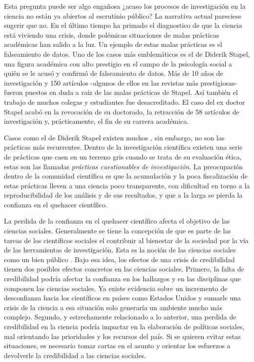 \documentclass[
]{book}
\begin{document}
Esta pregunta puede ser algo engañosa ¿acaso los procesos de investigación en la ciencia no están ya abiertos al escrutinio público? La narrativa actual pareciese sugerir que no. En el último tiempo ha primado el diagnostico de que la ciencia está viviendo una crisis, donde polémicas situaciones de malas prácticas académicas han salido a la luz. Un ejemplo de estas malas prácticas es el falseamiento de datos. Uno de los casos más emblemáticos es el de Diderik Stapel, una figura académica con alto prestigio en el campo de la psicología social a quién se le acusó y confirmó de falseamiento de datos. Más de 10 años de investigación y 150 artículos -algunos de ellos en las revistas más prestigiosas- fueron puestos en duda a raíz de las malas prácticas de Stapel. Así también el trabajo de muchos colegas y estudiantes fue desacreditado. El caso del ex doctor Stapel acabó en la revocación de su doctorado, la retracción de 58 artículos de investigación y, prácticamente, el fin de su carrera académica.

Casos como el de Diderik Stapel existen muchos \citep[ver][]{abrilruiz_Manzanas_2019}, sin embargo, no son las prácticas más recurrentes. Dentro de la investigación científica existen una serie de prácticas que caen en un terreno gris cuando se trata de su evaluación ética, estas son las llamadas \emph{prácticas cuestionables de investigación}. La preocupación dentro de la comunidad científica es que la acumulación y la poca fiscalización de estas prácticas lleven a una ciencia poco transparente, con dificultad en torno a la reproducibilidad de los análisis y de sus resultados, y que a la larga se pierda la confianza en el quehacer científico.

La perdida de la confianza en el quehacer científico afecta el objetivo de las ciencias sociales. Generalmente se tiene la concepción de que es parte de las tareas de los científicos sociales el contribuir al bienestar de la sociedad por la vía de las herramientas de investigación. Esta es la noción de las ciencias sociales como un bien público \citep{thibodeaux_Production_2016}. Bajo esa idea, los efectos de una crisis de credibilidad tienen dos posibles efectos concretos en las ciencias sociales. Primero, la falta de credibilidad podría afectar la confianza en los hallazgos y en las disciplinas que componen las ciencias sociales. Ya existe evidencia sobre un incremento de desconfianza hacia los científicos en países como Estados Unidos \citep{motta_Dynamics_2018} y sumarle una crisis de la ciencia a esa situación solo generaría un ambiente mucho más complejo. Segundo, y estrechamente relacionado a lo anterior, una perdida de credibilidad en la ciencia podría impactar en la elaboración de políticas sociales, mal orientando las prioridades y los recursos del país. Si se quieren evitar estas situaciones, es necesario tomar cartas en el asunto y orientar los esfuerzos a devolverle la credibilidad a las ciencias sociales.
\end{document}
